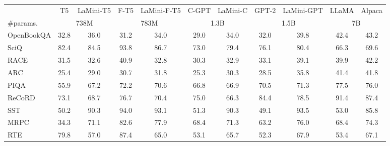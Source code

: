 \documentclass[11pt]{article}
\newcommand{\modelname}{LaMini\xspace}
\begin{document}
\begin{table}[t]
{    }
    \label{tab:model_family}
\end{table} \begin{table*}[t]
\centering
\small
\setlength{\tabcolsep}{3pt}
\begin{tabular}{@{}lcccccccccc@{}}
\toprule
               & T5     &  \modelname-T5   &  F-T5       & \modelname-F-T5 & C-GPT & \modelname-C & GPT-2  & \modelname-GPT  & LLaMA  &  Alpaca        \\ \cmidrule(rl){2-3} \cmidrule(rl){4-5} \cmidrule(rl){6-7} \cmidrule(rl){8-9} \cmidrule(l){10-11}
\#params.  & \multicolumn{2}{c}{738M} & \multicolumn{2}{c}{783M}           & \multicolumn{2}{c}{1.3B}     & \multicolumn{2}{c}{1.5B} & \multicolumn{2}{c}{7B} \\ \midrule
OpenBookQA     & 32.8   & 36.0            & 31.2          & 34.0               & 29.0         & 34.0          & 32.0   & 39.8            & 42.4   & 43.2          \\
SciQ           & 82.4   & 84.5            & 93.8          & 86.7               & 73.0         & 79.4          & 76.1   & 80.4            & 66.3   & 69.6          \\
RACE           & 31.5   & 32.6            & 40.9          & 32.8               & 30.3         & 32.9          & 33.1   & 39.1            & 39.9   & 42.2          \\
ARC            & 25.4   & 29.0            & 30.7          & 31.8               & 25.3         & 30.3          & 28.5   & 35.8            & 41.4   & 41.8          \\
PIQA           & 55.9   & 67.2            & 72.2          & 70.6               & 66.8         & 66.9          & 70.5   & 71.3            & 77.5   & 76.0          \\
ReCoRD         & 73.1   & 68.7            & 76.7          & 70.4               & 75.0         & 66.3          & 84.4   & 78.5            & 91.4   & 87.4          \\
SST            & 50.2   & 90.3            & 94.0          & 93.1               & 51.3         & 90.3          & 49.1   & 93.5            & 53.0   & 85.8          \\
MRPC           & 34.3   & 71.1            & 82.6          & 77.9               & 68.4         & 71.3          & 63.2   & 76.0            & 68.4   & 74.3          \\
RTE            & 79.8   & 57.0            & 87.4          & 65.0               & 53.1         & 65.7          & 52.3   & 67.9            & 53.4   & 67.1          \\

\end{tabular}
\end{table*}
\end{document}
